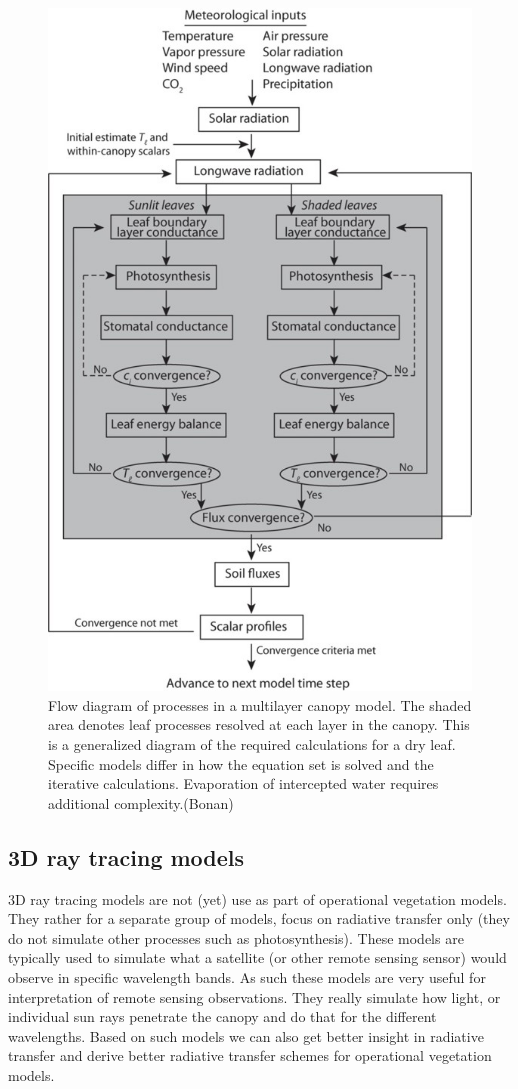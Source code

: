 \documentclass[12pt,oneside]{book}
\begin{document}
\begin{figure}

{\centering \includegraphics[width=0.8\linewidth]{figures/chap3/f326_multilayer_solving} 

}

\caption{Flow diagram of processes in a multilayer canopy model. The shaded area denotes leaf processes resolved at each layer in the canopy. This is a generalized diagram of the required calculations for a dry leaf. Specific models differ in how the equation set is solved and the iterative calculations. Evaporation of intercepted water requires additional complexity.(Bonan)}\label{fig:f326}
\end{figure}

\subsection{3D ray tracing models}\label{d-ray-tracing-models}

3D ray tracing models are not (yet) use as part of operational
vegetation models. They rather for a separate group of models, focus on
radiative transfer only (they do not simulate other processes such as
photosynthesis). These models are typically used to simulate what a
satellite (or other remote sensing sensor) would observe in specific
wavelength bands. As such these models are very useful for
interpretation of remote sensing observations. They really simulate how
light, or individual sun rays penetrate the canopy and do that for the
different wavelengths. Based on such models we can also get better
insight in radiative transfer and derive better radiative transfer
schemes for operational vegetation models.
\end{document}
